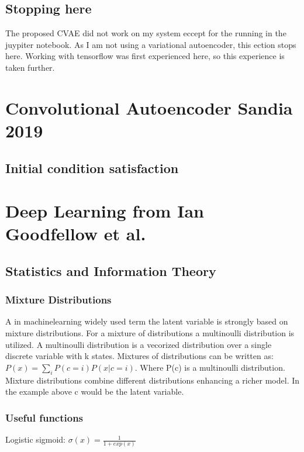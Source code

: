 \documentclass[12pt, a4paper]{article}
\begin{document}
	\subsection{Stopping here}
		The proposed CVAE did not work on my system eccept for the running in the juypiter notebook. As I am not using a variational autoencoder, this ection stops here. Working with tensorflow was first experienced here, so this experience is taken further.
	\section{Convolutional Autoencoder Sandia 2019}
	\subsection{Initial condition satisfaction}
	\section{Deep Learning from Ian Goodfellow et al.}
	\subsection{Statistics and Information Theory}
	\subsubsection{Mixture Distributions}
	A in machinelearning widely used term the latent variable is strongly based on mixture distributions. For a mixture of distributions a multinoulli distribution is utilized. A multinoulli distribution is a vecorized distribution over a single discrete variable with k states. Mixtures of distributions can be written as:
	$P(x)=\sum_{i} P(c=i)P(x|c=i)$.
	Where P(c) is a multinoulli distribution. Mixture distributions combine different distributions enhancing a richer model. In the example above c would be the latent variable.
	\subsubsection{Useful functions}
	Logistic sigmoid: $\sigma(x)=\frac{1}{1+exp(x)}$
\end{document}
